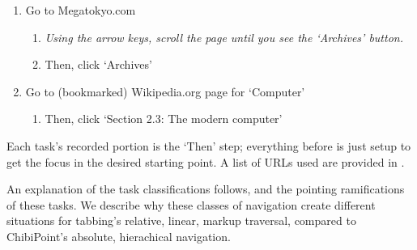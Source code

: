 \documentclass[11pt,openright,a4paper]{report}
\begin{document}
\begin{enumerate}
\item Go to Megatokyo.com
	\begin{enumerate}
		\item \textit{Using the arrow keys, scroll the page until you see the `Archives' button.}
		\item Then, click `Archives'
	\end{enumerate}

\item Go to (bookmarked) Wikipedia.org page for `Computer'
	\begin{enumerate}
		\item Then, click `Section 2.3: The modern computer'
	\end{enumerate}
\end{enumerate}

Each task's recorded portion is the `Then' step; everything before is just setup to get the focus in the desired starting point. A list of URLs used are provided in .

An explanation of the task classifications follows, and the pointing ramifications of these tasks. We describe why these classes of navigation create different situations for tabbing's relative, linear, markup traversal, compared to ChibiPoint's absolute, hierachical navigation.

\newcommand{\TaskDef}[3]{\item \textbf{#1}: #2\\\\\textit{#3}}
\end{document}
